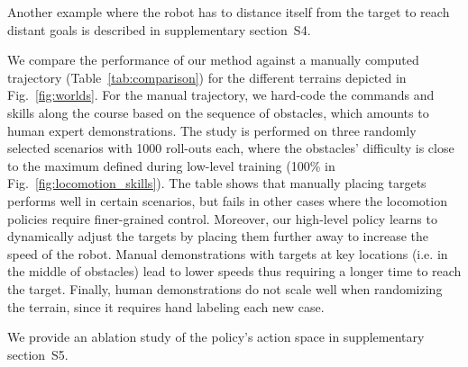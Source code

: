 \documentclass[conference]{IEEEtran}
\begin{document}
Another example where the robot has to distance itself from the target to reach distant goals is described in supplementary section~S4.





We compare the performance of our method against a manually computed trajectory  (Table~\ref{tab:comparison}) for the different terrains depicted in Fig.~\ref{fig:worlds}. For the manual trajectory, we hard-code the commands and skills along the course based on the sequence of obstacles, which amounts to human expert demonstrations. 
The study is performed on three randomly selected scenarios with 1000 roll-outs each, where the obstacles' difficulty is close to the maximum defined during low-level training (100\% in Fig.~\ref{fig:locomotion_skills}).
The table shows that manually placing targets performs well in certain scenarios, but fails in other cases where the locomotion policies require finer-grained control.
Moreover, our high-level policy learns to dynamically adjust the targets by placing them further away to increase the speed of the robot. Manual demonstrations with targets at key locations (i.e. in the middle of obstacles) lead to lower speeds thus requiring a longer time to reach the target.
Finally, human demonstrations do not scale well when randomizing the terrain, since it requires hand labeling each new case.

We provide an ablation study of the policy's action space in supplementary section~S5.
\end{document}
